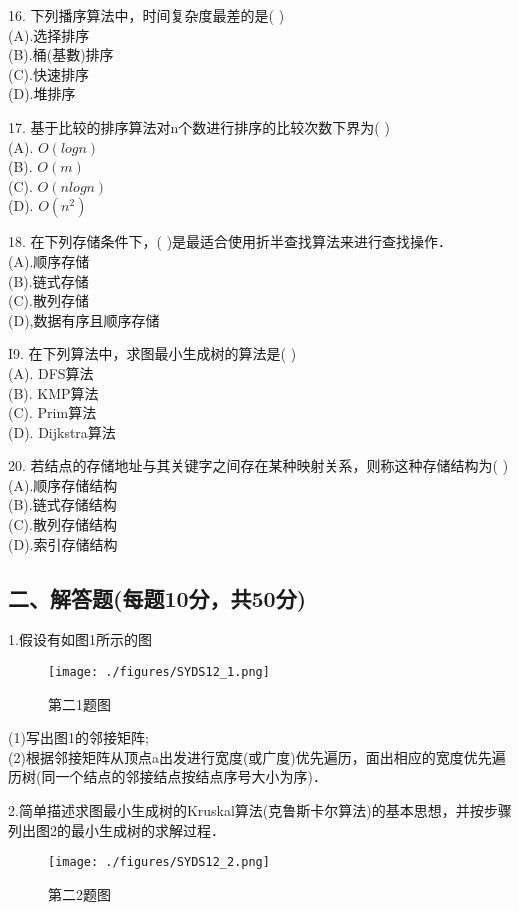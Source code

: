 16. 下列播序算法中，时间复杂度最差的是( ) \\
(A).选择排序 \\
(B).桶(基數)排序 \\
(C).快速排序 \\
(D).堆排序

17. 基于比较的排序算法对n个数进行排序的比较次数下界为( ) \\
(A). $O(logn)$ \\
(B). $O(m)$ \\
(C). $O(nlogn)$ \\
(D). $O(n^2)$

18. 在下列存储条件下，( )是最适合使用折半查找算法来进行查找操作． \\
(A).顺序存储 \\
(B).链式存储 \\
(C).散列存储 \\
(D),数据有序且顺序存储

I9. 在下列算法中，求图最小生成树的算法是( ) \\
(A). DFS算法 \\
(B). KMP算法 \\
(C). Prim算法 \\
(D). Dijkstra算法

20. 若结点的存储地址与其关键字之间存在某种映射关系，则称这种存储结构为( ) \\
(A).顺序存储结构 \\
(B).链式存储结构 \\
(C).散列存储结构 \\
(D).索引存储结构

\subsection{二、解答题(每题10分，共50分)}

1.假设有如图1所示的图 \\
\begin{figure}[ht]
\centering
\texttt{[image: ./figures/SYDS12\_1.png]}
\caption{第二1题图} \label{SYDS12_fig1}
\end{figure}
(1)写出图1的邻接矩阵; \\
(2)根据邻接矩阵从顶点a出发进行宽度(或广度)优先遍历，面出相应的宽度优先遍历树(同一个结点的邻接结点按结点序号大小为序)．


2.简单描述求图最小生成树的Kruskal算法(克鲁斯卡尔算法)的基本思想，并按步骤列出图2的最小生成树的求解过程．
\begin{figure}[ht]
\centering
\texttt{[image: ./figures/SYDS12\_2.png]}
\caption{第二2题图} \label{SYDS12_fig2}
\end{figure}

